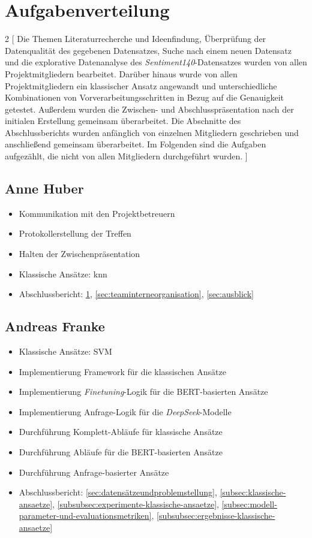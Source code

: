 \section{Aufgabenverteilung}\label{sec:aufgabenverteilung}

\begin{multicols}{2}
[
Die Themen Literaturrecherche und Ideenfindung, Überprüfung der Datenqualität des gegebenen Datensatzes, Suche nach einem neuen Datensatz und die explorative Datenanalyse des \textit{Sentiment140}-Datensatzes wurden von allen Projektmitgliedern bearbeitet.
Darüber hinaus wurde von allen Projektmitgliedern ein klassischer Ansatz angewandt und unterschiedliche Kombinationen von Vorverarbeitungsschritten in Bezug auf die Genauigkeit getestet.
Außerdem wurden die Zwischen- und Abschlusspräsentation nach der initialen Erstellung gemeinsam überarbeitet.
Die Abschnitte des Abschlussberichts wurden anfänglich von einzelnen Mitgliedern geschrieben und anschließend gemeinsam überarbeitet.
Im Folgenden sind die Aufgaben aufgezählt, die nicht von allen Mitgliedern durchgeführt wurden.
]

\subsection{Anne Huber}
\begin{itemize}
    \item Kommunikation mit den Projektbetreuern
    \item Protokollerstellung der Treffen
    \item Halten der Zwischenpräsentation
    \item Klassische Ansätze: \gls{knn}
    \item Abschlussbericht: \ref{sec:aufgabenverteilung}, \ref{sec:teaminterneorganisation}, \ref{sec:ausblick}
\end{itemize}


\subsection{Andreas Franke}
\begin{itemize}
    \item Klassische Ansätze: SVM
    \item Implementierung Framework für die klassischen Ansätze
    \item Implementierung \textit{Finetuning}-Logik für die BERT-basierten Ansätze
    \item Implementierung Anfrage-Logik für die \textit{DeepSeek}-Modelle
    \item Durchführung Komplett-Abläufe für klassische Ansätze
    \item Durchführung Abläufe für die BERT-basierten Ansätze
    \item Durchführung Anfrage-basierter Ansätze
    \item Abschlussbericht: \ref{sec:datensätzeundproblemstellung}, \ref{subsec:klassische-ansaetze}, \ref{subsubsec:experimente-klassische-ansaetze}, \ref{subsec:modell-parameter-und-evaluationsmetriken}, \ref{subsubsec:ergebnisse-klassische-ansaetze}
\end{itemize}


\end{multicols}

